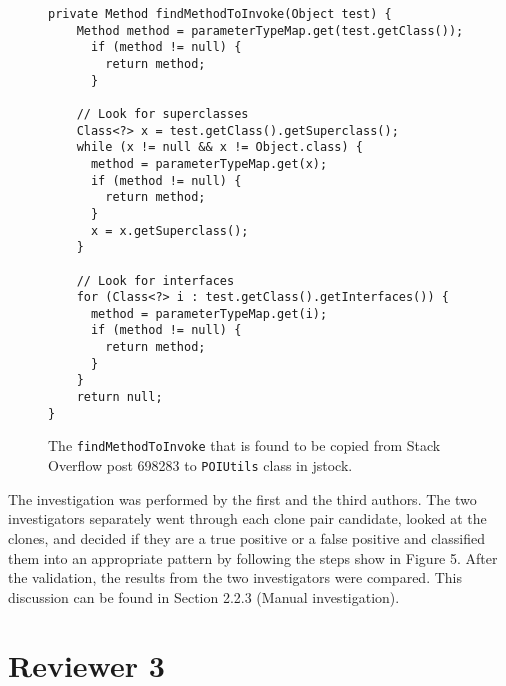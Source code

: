 \documentclass[a4paper,twoside,10pt]{reviewresponse}
\begin{document}
\begin{figure}[H]
	\begin{lstlisting}
private Method findMethodToInvoke(Object test) {
	Method method = parameterTypeMap.get(test.getClass());
	  if (method != null) {
	    return method;
	  }
	
	// Look for superclasses
	Class<?> x = test.getClass().getSuperclass();
	while (x != null && x != Object.class) {
	  method = parameterTypeMap.get(x);
	  if (method != null) {
	    return method;
	  }
	  x = x.getSuperclass();
	}
	
	// Look for interfaces
	for (Class<?> i : test.getClass().getInterfaces()) {
	  method = parameterTypeMap.get(i);
	  if (method != null) {
	    return method;
	  }
	}
	return null;
}
	\end{lstlisting}
	\caption{The {\small\texttt{findMethodToInvoke}} that is found to be copied from Stack Overflow post 698283 to {\small\texttt{POIUtils}} class in \textsf{jstock}.}
	\label{fig:jstock_code}
\end{figure}

The investigation was performed by the first and
the third authors. The two investigators separately went through each clone pair
candidate, looked at the clones, and decided if they are a true positive or a
false positive and classified them into an appropriate pattern by following the steps show in Figure 5. 
After the validation, the results from the two investigators were compared. 
This discussion can be found in Section 2.2.3 (Manual investigation).

\section{Reviewer 3}

\end{document}
